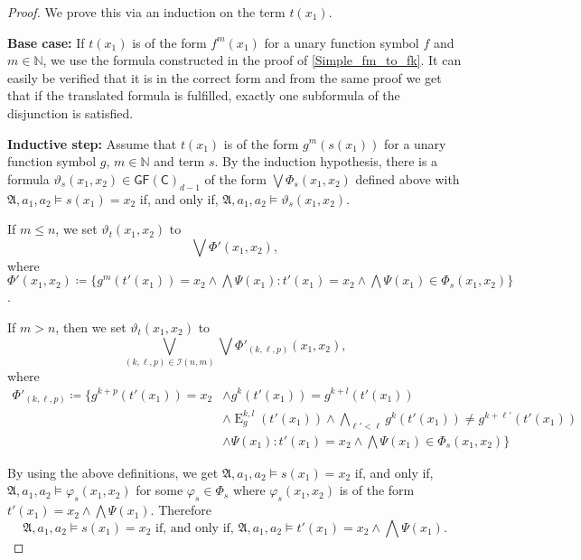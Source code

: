 \documentclass[a4paper,11pt,DIV=15]{scrartcl} %
\renewcommand{\phi}{\varphi}
\theoremstyle{plain}
\theoremstyle{definition}
\newcommand{\GFC}{\mathsf{GF}(\mathsf{C})}
\renewcommand{\theta}{\vartheta}
\begin{document}
\begin{proof}
	We prove this via an induction on the term $t(x_1)$.
	
	\textbf{Base case:}
	If $t(x_1)$ is of the form $f^{m}(x_1)$ for a unary function symbol $f$ and $m\in \mathbb N$, we use the formula constructed in the proof of \cref{Simple_fm_to_fk}.
	It can easily be verified that it is in the correct form and from the same proof we get that if the translated formula is fulfilled, exactly one subformula of the disjunction is satisfied.
	
	\textbf{Inductive step:}
	Assume that $t(x_1)$ is of the form $g^m(s(x_1))$ for a unary function symbol $g$, $m\in\mathbb N$ and term $s$.
	By the induction hypothesis, there is a formula $\theta_{s}(x_1,x_2)\in \GFC_{d-1}$ of the form $\bigvee \Phi_s(x_1,x_2)$ defined above with $\mathfrak A,a_1,a_2 \models s(x_1)=x_2$ if, and only if, $\mathfrak A,a_1,a_2\models \theta_{s}(x_1,x_2)$.
	
	If $m\leq n$, we set $\theta_{t}(x_1,x_2)$ to
	$$\bigvee \Phi'(x_1,x_2),$$
	where $\Phi'(x_1,x_2)\coloneqq\{g^{m}(t'(x_1))=x_2 \land \bigwedge \Psi(x_1) : t'(x_1)=x_2 \land \bigwedge \Psi(x_1)\in \Phi_s(x_1,x_2)\}$.
	
	If $m>n$, then we set $\theta_{t}(x_1,x_2)$ to
	$$\bigvee_{(k,\ell,p)\in \mathcal I(n,m)} \bigvee \Phi'_{(k,\ell,p)}(x_1,x_2),$$
	where 
	\begin{align*}
		\Phi'_{(k,\ell,p)}\coloneqq \{g^{k+p}(t'(x_1))=x_2 &\land g^{k}(t'(x_1))=g^{k+l}(t'(x_1)) \\
		& \land \operatorname{E}^{k,l}_g(t'(x_1)) \land \bigwedge_{\ell'<\ell} g^{k}(t'(x_1))\neq g^{k+\ell'}(t'(x_1)) \\
		& \land \Psi(x_1) : t'(x_1)=x_2 \land \bigwedge \Psi(x_1)\in \Phi_s(x_1,x_2)\}
	\end{align*}
	
	By using the above definitions, we get $\mathfrak A,a_1,a_2\models s(x_1)=x_2$ if, and only if, $\mathfrak A,a_1,a_2\models \phi_s(x_1,x_2)$ for some $\phi_s\in\Phi_s$ where $\phi_s(x_1,x_2)$ is of the form $t'(x_1)=x_2 \land \bigwedge \Psi(x_1)$.
	Therefore
	\begin{equation}
		\mathfrak A, a_1,a_2 \models s(x_1)=x_2 \text{ if, and only if, } \mathfrak A,a_1,a_2 \models t'(x_1)=x_2 \land \bigwedge \Psi(x_1).
		\label{Equivalence_s_and_tPsi}
	\end{equation}
	

\end{proof}
\end{document}

